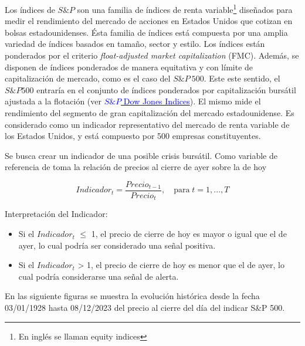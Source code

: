 \documentclass[
  oneside]{article}
\begin{document}
Los índices de \(S\&P\) son una familia de índices de renta
variable\footnote{En inglés se llaman equity indices} diseñados para
medir el rendimiento del mercado de acciones en Estados Unidos que
cotizan en bolsas estadounidenses. Ésta familia de índices está
compuesta por una amplia variedad de índices basados en tamaño, sector y
estilo. Los índices están ponderados por el criterio
\textit{float-adjusted market capitalization} (FMC). Además, se disponen
de índices ponderados de manera equitativa y con límite de
capitalización de mercado, como es el caso del \(S\&P\:500\). Este este
sentido, el \(S\&P 500\) entraría en el conjunto de índices ponderados
por capitalización bursátil ajustada a la flotación (ver
\href{http://www.overleaf.com}{\textcolor{blue}{$S\&P$ Dow Jones Indices}}).
El mismo mide el rendimiento del segmento de gran capitalización del
mercado estadounidense. Es considerado como un indicador representativo
del mercado de renta variable de los Estados Unidos, y está compuesto
por 500 empresas constituyentes.

Se busca crear un indicador de una posible crisis bursátil. Como
variable de referencia de toma la relación de precios al cierre de ayer
sobre la de hoy

\begin{equation}
Indicador_t=\frac{Precio_{t-1}}{Precio_t},\quad\text{para}\; t=1,...,T \label{eq:ind}
\end{equation} \vspace{0.5cm}

Interpretación del Indicador:

\begin{itemize}
\item Si el $Indicador_t$    $\leq$ 1, el precio de cierre de hoy es mayor o igual que el de ayer, lo cual podría ser considerado una señal positiva.
\item Si el $Indicador_t$ > 1, el precio de cierre de hoy es menor que el de ayer, lo cual podría considerarse una señal de alerta.
\end{itemize}

\vspace{1cm}

\newpage

En las siguiente figuras se muestra la evolución histórica desde la
fecha 03/01/1928 hasta 08/12/2023 del precio al cierre del día del
indicar S\&P 500.
\end{document}
